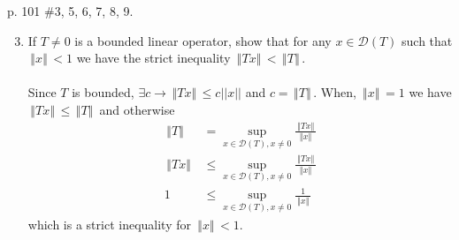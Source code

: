 \documentclass[10pt,a4paper]{report}
\newcommand{\NORM}[1]{\,\left \Vert #1 \right \Vert\,}
\begin{document}
\newpage
 p. 101 \#3, 5, 6, 7, 8, 9. 
\begin{enumerate}
	\setcounter{enumi}{2}
	\item If $T \ne 0$ is a bounded linear operator, show that for any $x \in \mathcal{D}(T)$ such that $\NORM{x} < 1$ we have the strict inequality $\NORM{Tx} < \NORM{T}$.\\
	\\
	Since $T$ is bounded, $\exists c \to \NORM{Tx}\le c||x||$ and $c = \NORM{T}$.  When, $\NORM{x} = 1$ we have $\NORM{Tx} \le \NORM{T}$ and otherwise
	\begin{align*}
		\NORM{T} &= \sup_{x\in\mathcal{D}(T),x\ne 0} \frac{\NORM{Tx}}{\NORM{x}} \\
		\NORM{Tx} &\le  \sup_{x\in\mathcal{D}(T),x\ne 0} \frac{\NORM{Tx}}{\NORM{x}} \\
		1 & \le \sup_{x\in\mathcal{D}(T),x\ne 0} \frac{1}{\NORM{x}}
	\end{align*}which is a strict inequality for $\NORM{x}<1$.
	

\end{enumerate}
\end{document}
